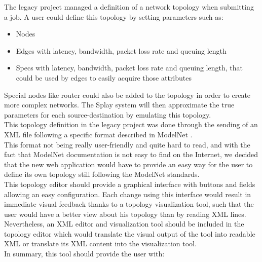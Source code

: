 \documentclass{eplmastersthesis}
\begin{document}
          The legacy project managed a definition of a network topology when
          submitting a job. A user could define this topology by setting
          parameters such as:

          \begin{itemize}
            \item Nodes
            \item Edges with latency, bandwidth, packet loss rate and queuing
            length
            \item Specs with latency, bandwidth, packet loss rate and queuing
            length, that could be used by edges to easily acquire those
            attributes
          \end{itemize}

          Special nodes like router could also be added to the topology in order
          to create more complex networks. The Splay system will then
          approximate the true parameters for each source-destination by
          emulating this topology.\\

          This topology definition in the legacy project was done through
          the sending of an XML file following a specific format described
          in ModelNet \cite{ModelNet}.\\
          This format not being really user-friendly and quite hard to read,
          and with the fact that ModelNet documentation is not easy to find
          on the Internet, we decided that the new web application would have
          to provide an easy way for the user to define its own topology
          still following the ModelNet standards.\\

          This topology editor should provide a graphical interface with
          buttons and fields allowing an easy configuration. Each change
          using this interface would result in immediate visual feedback
          thanks to a topology visualization tool, such that the user would
          have a better view about his topology than by reading XML lines.
          Nevertheless, an XML editor and visualization tool should be included
          in the topology editor which would translate the visual output of
          the tool into readable XML or translate its XML content into the
          visualization tool.\\

          In summary, this tool should provide the user with:
\end{document}
